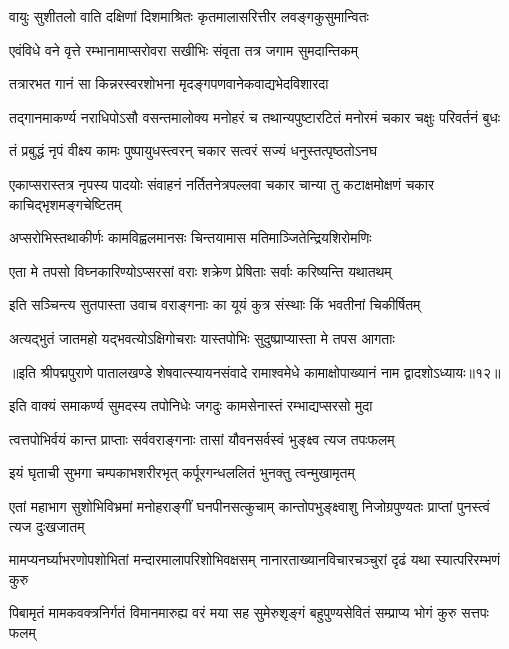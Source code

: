 \twolineshloka
{वायुः सुशीतलो वाति दक्षिणां दिशमाश्रितः}
{कृतमालासरित्तीर लवङ्गकुसुमान्वितः}%

\twolineshloka
{एवंविधे वने वृत्ते रम्भानामाप्सरोवरा}
{सखीभिः संवृता तत्र जगाम सुमदान्तिकम्}%

\twolineshloka
{तत्रारभत गानं सा किन्नरस्वरशोभना}
{मृदङ्गपणवानेकवाद्यभेदविशारदा}%

\fourlineindentedshloka
{तद्गानमाकर्ण्य नराधिपोऽसौ}
{वसन्तमालोक्य मनोहरं च}
{तथान्यपुष्टारटितं मनोरमं}
{चकार चक्षुः परिवर्तनं बुधः}%

\twolineshloka
{तं प्रबुद्धं नृपं वीक्ष्य कामः पुष्पायुधस्त्वरन्}
{चकार सत्वरं सज्यं धनुस्तत्पृष्ठतोऽनघ}%

\fourlineindentedshloka
{एकाप्सरास्तत्र नृपस्य पादयोः}
{संवाहनं नर्तितनेत्रपल्लवा}
{चकार चान्या तु कटाक्षमोक्षणं}
{चकार काचिद्भृशमङ्गचेष्टितम्}%

\twolineshloka
{अप्सरोभिस्तथाकीर्णः कामविह्वलमानसः}
{चिन्तयामास मतिमाञ्जितेन्द्रियशिरोमणिः}%

\twolineshloka
{एता मे तपसो विघ्नकारिण्योऽप्सरसां वराः}
{शक्रेण प्रेषिताः सर्वाः करिष्यन्ति यथातथम्}%

\twolineshloka
{इति सञ्चिन्त्य सुतपास्ता उवाच वराङ्गनाः}
{का यूयं कुत्र संस्थाः किं भवतीनां चिकीर्षितम्}%

\twolineshloka
{अत्यद्भुतं जातमहो यद्भवत्योऽक्षिगोचराः}
{यास्तपोभिः सुदुष्प्राप्यास्ता मे तपस आगताः}%

{॥इति श्रीपद्मपुराणे पातालखण्डे शेषवात्स्यायनसंवादे रामाश्वमेधे कामाक्षोपाख्यानं नाम द्वादशोऽध्यायः॥१२॥}



\twolineshloka
{इति वाक्यं समाकर्ण्य सुमदस्य तपोनिधेः}
{जगदुः कामसेनास्तं रम्भाद्यप्सरसो मुदा}%

\twolineshloka
{त्वत्तपोभिर्वयं कान्त प्राप्ताः सर्ववराङ्गनाः}
{तासां यौवनसर्वस्वं भुङ्क्ष्व त्यज तपःफलम्}%

\twolineshloka
{इयं घृताची सुभगा चम्पकाभशरीरभृत्}
{कर्पूरगन्धललितं भुनक्तु त्वन्मुखामृतम्}%

\fourlineindentedshloka
{एतां महाभाग सुशोभिविभ्रमां}
{मनोहराङ्गीं घनपीनसत्कुचाम्}
{कान्तोपभुङ्क्ष्वाशु निजोग्रपुण्यतः}
{प्राप्तां पुनस्त्वं त्यज दुःखजातम्}%

\fourlineindentedshloka
{मामप्यनर्घ्याभरणोपशोभितां}
{मन्दारमालापरिशोभिवक्षसम्}
{नानारताख्यानविचारचञ्चुरां}
{दृढं यथा स्यात्परिरम्भणं कुरु}%

\fourlineindentedshloka
{पिबामृतं मामकवक्त्रनिर्गतं}
{विमानमारुह्य वरं मया सह}
{सुमेरुशृङ्गं बहुपुण्यसेवितं}
{सम्प्राप्य भोगं कुरु सत्तपः फलम्}%

